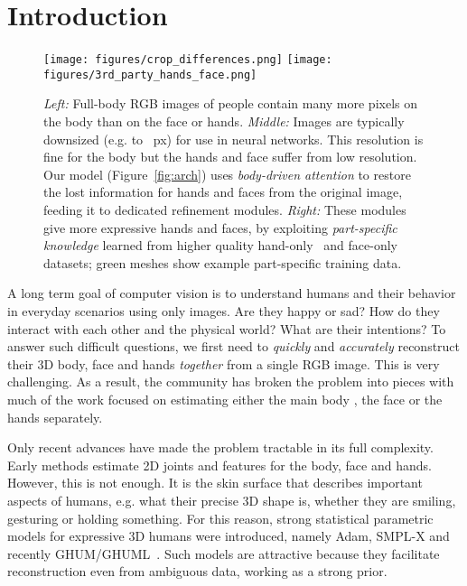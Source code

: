 \documentclass[runningheads]{llncs}
\newcommand{\smplx}{\mbox{SMPL-X}\xspace}
\newcommand{\adam}{\mbox{Adam}\xspace}
\newcommand{\ghum}{\mbox{GHUM}\xspace}
\newcommand{\ghuml}{\mbox{GHUML}\xspace}
\newcommand{\twoD}{2D\xspace}
\newcommand{\threeD}{3D\xspace}
\newcommand{\labelLEFT}{\mbox{\emph{Left:}}\xspace}
\newcommand{\labelMIDDLE}{\mbox{\emph{Middle:}}\xspace}
\newcommand{\labelRIGHT}{\mbox{\emph{Right:}}\xspace}
\newcommand{\eg}{e.g.\xspace}
\begin{document}
 \section{Introduction}
\label{sec:introduction}

\begin{figure}[t]
    \centering
    \centering      	   \texttt{[image: figures/crop\_differences.png]}
    \texttt{[image: figures/3rd\_party\_hands\_face.png]}
    \caption{
        \labelLEFT		Full-body RGB images of people contain
        many more pixels on the body than on the face or hands.
        \labelMIDDLE	Images are typically downsized (\eg to
        \mbox{ px}) for use in neural networks.
        This resolution is fine for the body but the hands and face
        suffer from low resolution. Our model (Figure~\ref{fig:arch})
        uses \emph{body-driven attention} to restore the lost information for hands and faces from the original image, feeding it to dedicated refinement modules.
        \labelRIGHT		These modules give more expressive hands and faces, by exploiting \emph{part-specific knowledge}
        learned from higher quality hand-only~\cite{Freihand2019} and
        face-only~\cite{karras2019style} datasets; green meshes show
        example part-specific training
        data.
    }
    \label{fig:problem_DownScale}
\end{figure}
 
A long term goal of computer vision is to understand humans and their behavior in everyday scenarios using only images.
Are they happy or sad?  How do they interact with each other and the physical world?   What are their intentions?
To answer such difficult questions, we first need to \emph{quickly} and \emph{accurately} reconstruct their \threeD body, face and hands \emph{together} from a single RGB image.
This is very challenging.
As a result, the community has broken the problem into pieces with much of the work
focused on estimating either the
main body 	\cite{Review_Gavrila,Review_Moeslund_2006,Sarafianos:Survey:2016},
the face 			\cite{zollhofer2018state}
or the hands 		\cite{Review_Erol_HandPose,Supancic:ICCV:2015,yuan2018depth}
separately.

Only recent advances have made the problem tractable in its full complexity. Early methods estimate \twoD joints and features \cite{cao2018openpose,Hidalgo_2019_ICCV} for the body, face and hands.
However, this is not enough.
It is the skin surface that describes important aspects of humans, \eg what their precise \threeD shape is, whether they are smiling, gesturing or holding something.
For this reason, strong statistical parametric models for expressive \threeD humans were introduced, namely \adam \cite{joo2018total}, \smplx \cite{Pavlakos_2019_CVPR} and recently
\ghum/\ghuml~\cite{Xu_2020_CVPR}.
Such models are attractive because they facilitate reconstruction even from ambiguous data, working as a strong prior.
\end{document}

